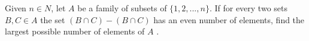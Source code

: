 Given $n \in N$, let $A$ be a family of subsets of $\{1,2,...,n\}$. If for every two sets $B,C \in A$ the set $(B \cap C) -(B \cap C)$ has an even number of elements, find the largest possible number of elements of $A$ .